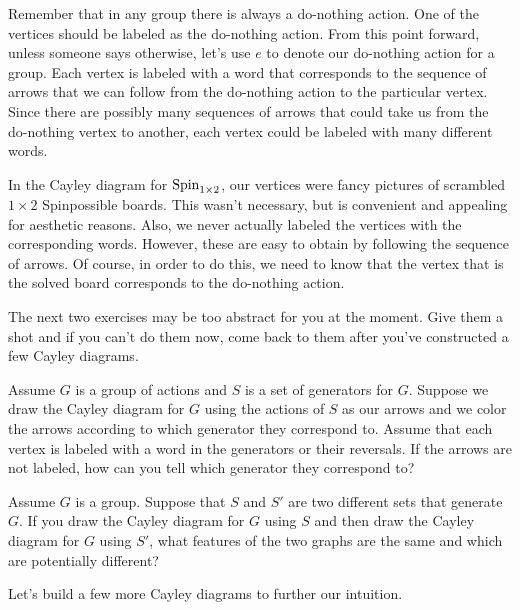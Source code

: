 Remember that in any group there is always a do-nothing action.  One of the vertices should be labeled as the do-nothing action.  From this point forward, unless someone says otherwise, let's use \(e\) to denote our do-nothing action for a group.  Each vertex is labeled with a word that corresponds to the sequence of arrows that we can follow from the do-nothing action to the particular vertex.  Since there are possibly many sequences of arrows that could take us from the do-nothing vertex to another, each vertex could be labeled with many different words.

In the Cayley diagram for \(\operatorname{Spin}_{1\times 2}\), our vertices were fancy pictures of scrambled \(1\times 2\) Spinpossible boards.  This wasn't necessary, but is convenient and appealing for aesthetic reasons.  Also, we never actually labeled the vertices with the corresponding words.  However, these are easy to obtain by following the sequence of arrows.  Of course, in order to do this, we need to know that the vertex that is the solved board corresponds to the do-nothing action.

The next two exercises may be too abstract for you at the moment.  Give them a shot and if you can't do them now, come back to them after you've constructed a few Cayley diagrams.

\begin{exercise}\label{exer:understanding_arrows}
Assume \(G\) is a group of actions and \(S\) is a set of generators for \(G\). Suppose we draw the Cayley diagram for \(G\) using the actions of \(S\) as our arrows and we color the arrows according to which generator they correspond to.  Assume that each vertex is labeled with a word in the generators or their reversals.  If the arrows are not labeled, how can you tell which generator they correspond to?
\end{exercise}

\begin{exercise}\label{exer:changing_generators_for_Cayley_diagram}
Assume \(G\) is a group.  Suppose that \(S\) and \(S'\) are two different sets that generate \(G\).  If you draw the Cayley diagram for \(G\) using \(S\) and then draw the Cayley diagram for \(G\) using \(S'\), what features of the two graphs are the same and which are potentially different?
\end{exercise}

Let's build a few more Cayley diagrams to further our intuition.

